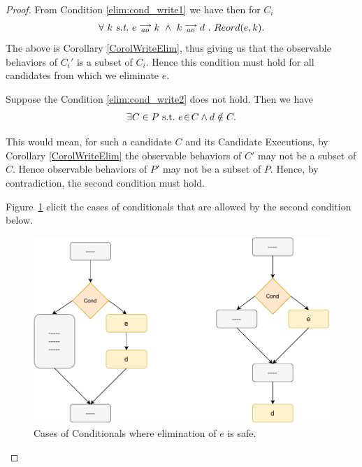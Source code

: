     \begin{proof}
    
        From Condition \ref{elim:cond_write1} we have then for $C_i$
        \begin{align*}
            \forall \ k \ \textit{s.t.} \ 
            \reln{e}{ao}{k} \ \wedge \ \reln{k}{ao}{d} \ . \ 
            Reord(e,k).
        \end{align*}
        The above is Corollary \ref{CorolWriteElim}, thus giving us that the observable behaviors of $C_i'$ is a subset of $C_i$. 
        Hence this condition must hold for all candidates from which we eliminate $e$. 
    
        Suppose the Condition \ref{elim:cond_write2} does not hold. 
        Then we have 
        \begin{align*}
            \exists C \in P \ \text{s.t.} \  e\!\in\!C \wedge d \notin C.
        \end{align*}
    
        This would mean, for such a candidate $C$ and its Candidate Executions, by Corollary \ref{CorolWriteElim} the observable behaviors of $C'$ may not be a subset of $C$. 
        Hence observable behaviors of $P'$ may not be a subset of $P$.
        Hence, by contradiction, the second condition must hold\footnotemark. 
    
        
        Figure~\ref{elim:cond} elicit the cases of conditionals that are allowed by the second condition below.
        \begin{figure}[H]
            \centering
            \includegraphics[scale=0.7]{5.Elimination/2.ValidEliminationProgram/Conditionals/ConditionalsCases.pdf}
            \caption{Cases of Conditionals where elimination of $e$ is safe.}
            \label{elim:cond}
        \end{figure}
    
    \end{proof}
    
